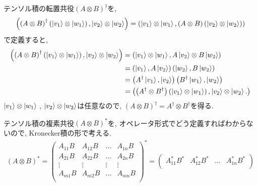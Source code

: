 \begin{ex}
    \label{ex2.28}
    テンソル積の転置共役$\left( A \otimes B \right)^\dagger$を,
    \begin{align*}
        \left(
        \left(A \otimes B \right)^\dagger
        \left( \ket{v_1} \otimes \ket{w_1}\right),
        \ket{v_2} \otimes \ket{w_2}
        \right)
        =
        \left(
        \ket{v_1} \otimes \ket{w_1},
        \left( A \otimes B \right) \left( \ket{v_2} \otimes \ket{w_2} \right)
        \right)
    \end{align*}
    で定義すると,
    \begin{align*}
        \left(
        \left(A \otimes B \right)^\dagger
        \left( \ket{v_1} \otimes \ket{w_1}\right),
        \ket{v_2} \otimes \ket{w_2}
        \right)
         & =
        \left(
        \ket{v_1} \otimes \ket{w_1},
        A \ket{v_2} \otimes B \ket{w_2}
        \right) \\
         & =
        \left(
        \ket{v_1},A \ket{v_2}
        \right)
        \left(
        \ket{w_2},B \ket{w_2}
        \right) \\
         & =
        \left(
        A^\dagger \ket{v_1}, \ket{v_2}
        \right)
        \left(
        B^\dagger \ket{w_1}, \ket{w_2}
        \right) \\
         & =
        \left(
        \left(A^\dagger \otimes B^\dagger \right)
        \left( \ket{v_1} \otimes \ket{w_1}\right),
        \ket{v_2} \otimes \ket{w_2} .
        \right)
    \end{align*}
    $\ket{v_1} \otimes \ket{w_1}$
    ,
    $\ket{v_2} \otimes \ket{w_2}$は任意なので, $ \left(A \otimes B \right)^\dagger=A^\dagger \otimes B^\dagger$を得る.
    \par
    テンソル積の複素共役$\left(A \otimes B \right)^*$を, オペレータ形式でどう定義すればわからないので,
    Kronecker積の形で考える.
    \begin{align*}
        \left(A \otimes B \right)^*
        =
        \begin{pmatrix}
            A_{11}B & A_{12}B & \dots  & A_{1n}B \\
            A_{21}B & A_{22}B & \dots  & A_{2n}B \\
            \vdots  & \vdots  & \vdots & \vdots  \\
            A_{m1}B & A_{m2}B & \dots  & A_{mn}B \\
        \end{pmatrix}^*
        =
        \begin{pmatrix}
            A_{11}^* B^* & A_{12}^*B^* & \dots  & A_{1n}^*B^* \\

\end{pmatrix}
\end{align*}
\end{ex}
